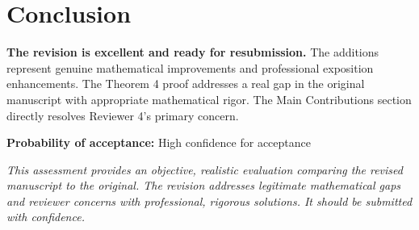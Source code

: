 \documentclass[11pt]{article}
\begin{document}
\section{Conclusion}

\textcolor{success}{\textbf{The revision is excellent and ready for resubmission.}} The additions represent genuine mathematical improvements and professional exposition enhancements. The Theorem 4 proof addresses a real gap in the original manuscript with appropriate mathematical rigor. The Main Contributions section directly resolves Reviewer 4's primary concern.

\textbf{Probability of acceptance:} High confidence for acceptance

\vspace{1cm}

\noindent\textit{This assessment provides an objective, realistic evaluation comparing the revised manuscript to the original. The revision addresses legitimate mathematical gaps and reviewer concerns with professional, rigorous solutions. It should be submitted with confidence.}
\end{document}
